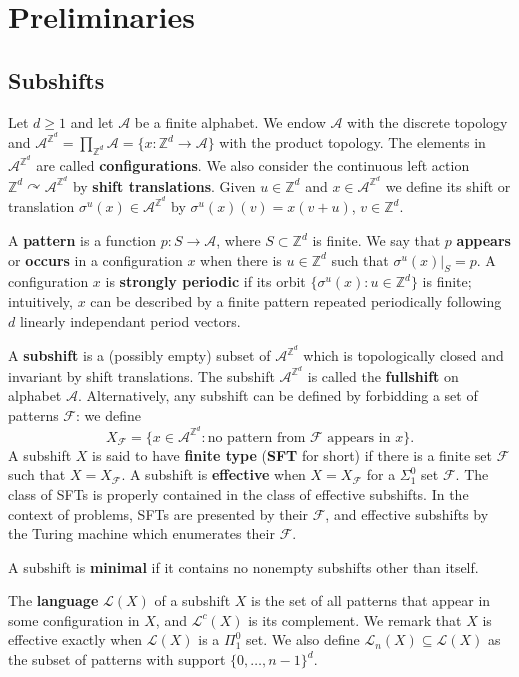 \documentclass[a4paper]{article}
\newcommand{\F}{\mathcal{F}}
\newcommand{\Le}{\mathcal{L}}
\newcommand{\coLe}{\mathcal{L}^c}
\newcommand{\Z}{\mathbb{Z}}
\newcommand{\Zd}{\mathbb{Z}^d}
\newcommand{\A}{\mathcal{A}}
\theoremstyle{definition}
\begin{document}
\section{Preliminaries
}\label{sec:preliminaries}


\subsection{Subshifts}\label{def:subshifts}

Let $d\geq 1$ and let $\A$ be a finite alphabet. We endow $\A$ with the discrete topology and $\A^{\Z^d}=\prod_{\Z^d}\A=\{x\colon \Z^d\to \A\}$ with the product topology. The elements in $\A^{\Zd}$ are called \textbf{configurations}. We also consider the continuous left action $\Z^d \curvearrowright \A^{\Zd}$ by \textbf{shift translations}. Given $u\in\Z^d$ and $x\in \A^{\Zd}$ we define its shift or translation $\sigma^u(x)\in \A^{\Zd}$ by $\sigma^u(x)(v)=x(v+u)$, $v\in\Z^d$.

A \textbf{pattern} is a function $p\colon S\to \A$, where $S\subset\Zd$ is finite. We say that $p$ \textbf{appears} or \textbf{occurs} in a configuration $x$ when there is $u\in\Z^d$ such that $\sigma^u(x)|_S=p$. 
 A configuration $x$ is \textbf{strongly periodic} if its orbit $\{\sigma^u(x) : u\in\Z^d\}$ is finite; intuitively, $x$ can be described by a finite pattern repeated periodically following $d$ linearly independant period vectors.
 
A \textbf{subshift} is a (possibly empty) subset of $\A^{\Zd}$ which is topologically closed and invariant by shift translations. The subshift $\A^{\Zd}$ is called the \textbf{fullshift} on alphabet $\A$.
Alternatively, any subshift can be defined by forbidding a set of patterns $\F$: we define
\[X_{\mathcal F}=\{x\in \A^{\Zd} : \text{no pattern from $\mathcal F$ appears in $x$}\}.\]
A subshift $X$ is said to have \textbf{finite type} (\textbf{SFT} for short) if there is a finite set $\F$ such that $X=X_{\F}$. A subshift is \textbf{effective} when $X=X_{\F}$ for a $\Sigma_1^0$ set $\F$. The class of SFTs is properly contained in the class of effective subshifts. In the context of problems, SFTs are presented by their $\F$, and effective subshifts by the Turing machine which enumerates their $\F$.


A subshift is \textbf{minimal} if it contains no nonempty subshifts other than itself. 

The \textbf{language} $\Le (X)$ of a subshift $X$ is the set of all patterns that appear in some configuration in $X$, and $\coLe(X)$ is its complement. We remark that $X$ is effective exactly when $\Le(X)$ is a $\Pi_1^0$ set. 
We also define 
$\Le_n(X) \subseteq \Le(X)$ as the subset of patterns with support $\{0,\dots,n-1\}^d$.
\end{document}
